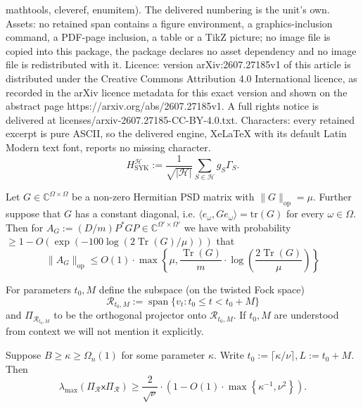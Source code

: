 \documentclass[10pt,a4paper]{amsart}
\newcommand{\C}{\mathbb C}
\newcommand{\Tr}{\operatorname{Tr}}
\newcommand{\cH}{\mathcal H}
\newcommand{\cR}{\mathcal R}
\newcommand{\sfx}{\mathsf x}
\newcommand{\spn}{\operatorname{span}}
\newcommand{\tr}{\mathrm{tr}}
\renewcommand{\geq}{\geqslant}
\renewcommand{\leq}{\leqslant}
\begin{document}
mathtools, cleveref, enumitem). The delivered numbering is the unit's own. Assets: no retained span contains a figure environment, a graphics-inclusion command, a PDF-page inclusion, a table or a TikZ picture; no image file is copied into this package, the package declares no asset dependency and no image file is redistributed with it. Licence: version arXiv:2607.27185v1 of this article is distributed under the Creative Commons Attribution 4.0 International licence, as recorded in the arXiv licence metadata for this exact version and shown on the abstract page https://arxiv.org/abs/2607.27185v1. A full rights notice is delivered at licenses/arxiv-2607.27185-CC-BY-4.0.txt. Characters: every retained excerpt is pure ASCII, so the delivered engine, XeLaTeX with its default Latin Modern text font, reports no missing character.
\begin{equation}\label{eq:syk-def}
    H^\cH_{\operatorname{SYK}}:= \frac{1}{\sqrt{|\cH|}}\sum_{S\in\cH}g_S\Gamma_S.
\end{equation}

\begin{lemma}\label{lem:random-proj-compression}
    Let $G\in\C^{\Omega\times\Omega}$ be a non-zero Hermitian PSD matrix with $\|G\|_{\operatorname{op}} = \mu$. Further suppose that $G$ has a constant diagonal, i.e. $\langle e_\omega, Ge_\omega\rangle = \tr(G)$ for every $\omega\in\Omega$. Then for $A_G:= (D/m)P^*GP\in\C^{\Omega'\times\Omega'}$ we have with probability $\geq 1 - O(\exp(-100\log(2\Tr(G)/\mu)))$ that
    \[\|A_G\|_{\operatorname{op}}\leq O(1)\cdot\max\left\{\mu, \frac{\Tr(G)}{m}\cdot\log\left(\frac{2\Tr(G)}{\mu}\right)\right\}\]
\end{lemma}

 \begin{definition}\label{defn:relevant-subspace}
 For parameters $t_0, M$ define the subspace (on the twisted Fock space)
\begin{equation}
    \cR_{t_0, M}:= \spn\{v_t: t_0\leq t < t_0 + M\}
\end{equation}
and $\Pi_{\cR_{t_0, M}}$ to be the orthogonal projector onto $\cR_{t_0, M}$. If $t_0, M$ are understood from context we will not mention it explicitly.
 \end{definition}

\begin{lemma}\label{lem:x-large-eig}
     Suppose $B\geq\kappa\geq\Omega_n(1)$ for some parameter $\kappa$. Write $t_0:= \lceil \kappa/\nu\rceil, L:= t_0 + M$. Then 
    \[\lambda_{\max}\left(\Pi_\cR \sfx \Pi_\cR\right)\geq\frac{2}{\sqrt{\nu}}\cdot\left(1 - O(1)\cdot\max\left\{\kappa^{-1}, \nu^2\right\}\right).\]
\end{lemma}
\end{document}
